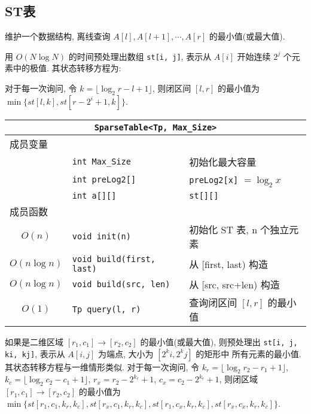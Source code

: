 

	\subsection{ST表}\small
维护一个数据结构, 离线查询 $A[l], A[l + 1], \cdots, A[r]$ 的最小值(或最大值).

用 $O(N\log N)$ 的时间预处理出数组 {\tt st[i, j]}, 表示从 $A[i]$ 开始连续
$2^j$ 个元素中的极值. 其状态转移方程为:



对于每一次询问, 令 $k = \lfloor \log_2{r - l + 1} \rfloor$, 则闭区间 $[l, r]$
的最小值为 $\min\{ st[l, k], st[r - 2^i + 1, k] \}$.

\begin{longtable}{c|l|l}
\multicolumn{3}{c}{{\tt SparseTable<Tp, Max\_Size>}} \\ \hline\hline
\multicolumn{3}{l}{成员变量} \\ \hline
& \verb`int Max_Size` & 初始化最大容量 \\
& \verb`int preLog2[]` & {\tt preLog2[x]} $=\log_2 x$ \\
& \verb`int a[][]` & {\tt st[][]} \\
\hline
\multicolumn{3}{l}{成员函数} \\ \hline
$O(n)$ & \verb`void init(n)` & 初始化 ST 表, n 个独立元素 \\
$O(n\log n)$ & \verb`void build(first, last)` & 从 [first, last) 构造 \\
$O(n\log n)$ & \verb`void build(src, len)` & 从 [src, src+len) 构造 \\
$O(1)$ & \verb`Tp query(l, r)` & 查询闭区间 $[l, r]$ 的最小值 \\
\hline\hline
\end{longtable}



如果是二维区域 $[r_1, c_1] \rightarrow [r_2, c_2]$ 的最小值(或最大值), 则预处理出
{\tt st[i, j, ki, kj]}, 表示从 $A[i, j]$ 为端点, 大小为 $[2^ki, 2^kj]$ 的矩形中
所有元素的最小值. 其状态转移方程与一维情形类似. 对于每一次询问, 令
$k_r = \lfloor \log_2{r_2 - r_1 + 1} \rfloor$,
$k_c = \lfloor \log_2{c_2 - c_1 + 1} \rfloor$, $r_x = r_2 - 2^{k_r} + 1$,
$c_x = c_2 - 2^{k_c} + 1$, 则闭区域 $[r_1, c_1] \rightarrow [r_2, c_2]$
的最小值为 $\min \{ st[r_1, c_1, k_r, k_c], st[r_x, c_1, k_r, k_c],
	st[r_1, c_x, k_r, k_c], st[r_x, c_x, k_r, k_c] \}$.

